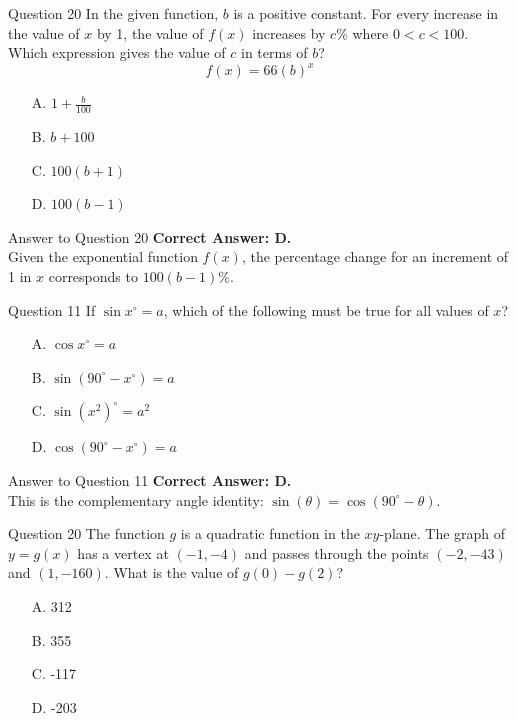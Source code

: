 \documentclass{beamer}
\begin{document}
\begin{frame}{Question 20}
In the given function, $b$ is a positive constant. For every increase in the value of $x$ by 1, the value of $f(x)$ increases by $c\%$ where $0 < c < 100$. Which expression gives the value of $c$ in terms of $b$?
\[
f(x) = 66(b)^x
\]
\begin{itemize}
    \item[A.] $1 + \frac{b}{100}$
    \item[B.] $b + 100$
    \item[C.] $100(b + 1)$
    \item[D.] $100(b - 1)$
\end{itemize}
\end{frame}

\begin{frame}{Answer to Question 20}
\textbf{Correct Answer: D.} \\
Given the exponential function $f(x)$, the percentage change for an increment of 1 in $x$ corresponds to $100(b - 1)\%$.
\end{frame}

\begin{frame}{Question 11}
If $\sin x^\circ = a$, which of the following must be true for all values of $x$?
\begin{itemize}
    \item[A.] $\cos x^\circ = a$
    \item[B.] $\sin(90^\circ - x^\circ) = a$
    \item[C.] $\sin (x^2)^\circ = a^2$
    \item[D.] $\cos(90^\circ - x^\circ) = a$
\end{itemize}
\end{frame}

\begin{frame}{Answer to Question 11}
\textbf{Correct Answer: D.} \\
This is the complementary angle identity: $\sin(\theta) = \cos(90^\circ - \theta)$.
\end{frame}

\begin{frame}{Question 20}
The function $g$ is a quadratic function in the $xy$-plane. The graph of $y = g(x)$ has a vertex at $(-1, -4)$ and passes through the points $(-2, -43)$ and $(1, -160)$.  
What is the value of $g(0) - g(2)$?
\begin{itemize}
    \item[A.] 312
    \item[B.] 355
    \item[C.] -117
    \item[D.] -203
\end{itemize}
\end{frame}
\end{document}
